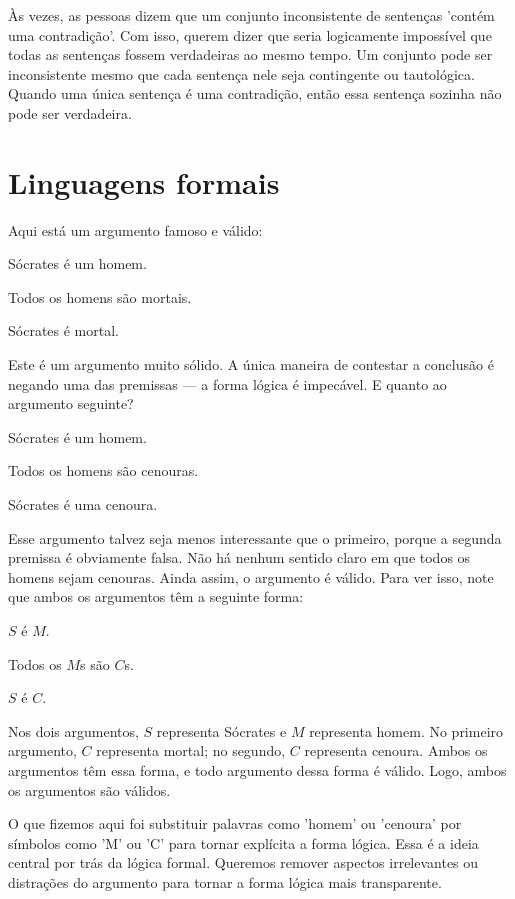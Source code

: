 Às vezes, as pessoas dizem que um conjunto inconsistente de sentenças 'contém uma contradição'. Com isso, querem dizer que seria logicamente impossível que todas as sentenças fossem verdadeiras ao mesmo tempo. Um conjunto pode ser inconsistente mesmo que cada sentença nele seja contingente ou tautológica. Quando uma única sentença é uma contradição, então essa sentença sozinha não pode ser verdadeira.

\section{Linguagens formais}

Aqui está um argumento famoso e válido:
\begin{earg}
\item[] Sócrates é um homem.
\item[] Todos os homens são mortais.
\item[\therefore] Sócrates é mortal.
\end{earg}
Este é um argumento muito sólido. A única maneira de contestar a conclusão é negando uma das premissas — a forma lógica é impecável. E quanto ao argumento seguinte?

\begin{earg}
\item[] Sócrates é um homem.
\item[] Todos os homens são cenouras.
\item[\therefore] Sócrates é uma cenoura.
\end{earg}

Esse argumento talvez seja menos interessante que o primeiro, porque a segunda premissa é obviamente falsa. Não há nenhum sentido claro em que todos os homens sejam cenouras. Ainda assim, o argumento é válido. Para ver isso, note que ambos os argumentos têm a seguinte forma:

\begin{earg}
\item[] $S$ é $M$.
\item[] Todos os $M$s são $C$s.
\item[\therefore] $S$ é $C$.
\end{earg}

Nos dois argumentos, $S$ representa Sócrates e $M$ representa homem. No primeiro argumento, $C$ representa mortal; no segundo, $C$ representa cenoura. Ambos os argumentos têm essa forma, e todo argumento dessa forma é válido. Logo, ambos os argumentos são válidos.

O que fizemos aqui foi substituir palavras como 'homem' ou 'cenoura' por símbolos como 'M' ou 'C' para tornar explícita a forma lógica. Essa é a ideia central por trás da lógica formal. Queremos remover aspectos irrelevantes ou distrações do argumento para tornar a forma lógica mais transparente.

